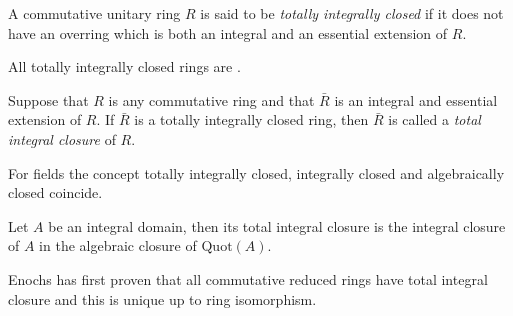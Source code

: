 \documentclass[12pt]{article}
\theoremstyle{definition}
\theoremstyle{remark}
\newcommand\qf[1]{\mathrm{Quot}(#1)}
\begin{document}
A commutative unitary ring $R$ is said to be \emph{totally integrally closed} if it does not have an overring which is both an integral and an essential extension of $R$. 

All totally integrally closed rings are .

Suppose that $R$ is any commutative ring and that $\bar R$ is an integral and essential extension of $R$. If $\bar R$ is a totally integrally closed ring, then $\bar R$ is called a \emph{total integral closure} of $R$.

For fields the concept totally integrally closed, integrally closed and algebraically closed coincide.

Let $A$ be an integral domain, then its total integral closure is the integral closure of $A$ in the algebraic closure of $\qf A$.

Enochs has first proven that all commutative reduced rings have total integral closure and this is unique up to ring isomorphism.



\end{document}
